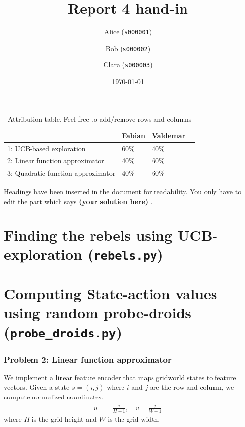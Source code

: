 \documentclass[12pt,twoside]{article}
\title{ Report 4 hand-in }
\date{ \today }
\author{Alice (\texttt{s000001})\and  Bob (\texttt{s000002})\and Clara (\texttt{s000003}) }
\newcommand\redt[1]{ {\textcolor[rgb]{0.60, 0.00, 0.00}{\textbf{ #1} } } }
\newcommand{\yoursolution}{ \redt{(your solution here) } }
\begin{document}
\maketitle

\begin{table}[ht!]
\caption{Attribution table. Feel free to add/remove rows and columns}
\begin{tabular}{llll}
\toprule
                                    & Fabian   & Valdemar   \\
\midrule
 1: UCB-based exploration           & 60\%  & 40\%  \\
 2: Linear function approximator    & 40\%  & 60\%  \\
 3: Quadratic function approximator & 40\%  & 60\%  \\
\bottomrule
\end{tabular}
\end{table}


Headings have been inserted in the document for readability. You only have to edit the part which says \yoursolution. 

\section{Finding the rebels using UCB-exploration (\texttt{rebels.py})} 

\section{Computing State-action values using random probe-droids (\texttt{probe\_droids.py})}

\subsubsection*{{\color{red}Problem 2: Linear function approximator}}

We implement a linear feature encoder that maps gridworld states to feature vectors. Given a state $s = (i, j)$ where $i$ and $j$ are the row and column, we compute normalized coordinates:
\begin{align}
u &= \frac{i}{H-1}, \quad v = \frac{j}{W-1}
\end{align}
where $H$ is the grid height and $W$ is the grid width.
\end{document}
